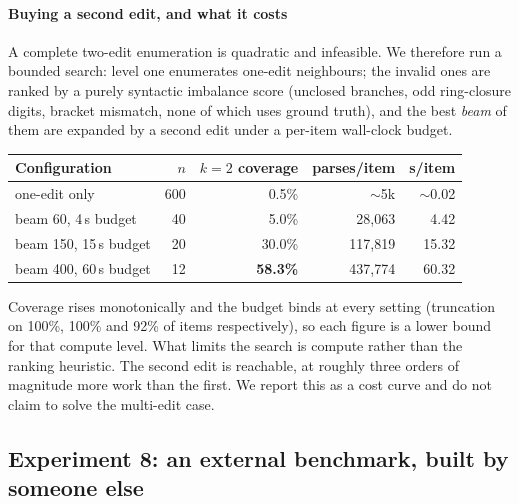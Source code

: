 \documentclass[conference]{IEEEtran}
\begin{document}
\paragraph{Buying a second edit, and what it costs}
A complete two-edit enumeration is quadratic and infeasible. We therefore run a
bounded search: level one enumerates one-edit neighbours; the invalid ones are
ranked by a purely syntactic imbalance score (unclosed branches, odd
ring-closure digits, bracket mismatch, none of which uses ground truth), and the best
\emph{beam} of them are expanded by a second edit under a per-item wall-clock
budget.

\begin{table}[t]
\centering\small
\begin{tabular}{lrrrr}
\toprule
Configuration & $n$ & $k{=}2$ coverage & parses/item & s/item \\
\midrule
one-edit only            & 600 & 0.5\%           & $\sim$5k    & $\sim$0.02 \\
beam 60, 4\,s budget     & 40  & 5.0\%           & 28{,}063    & 4.42 \\
beam 150, 15\,s budget   & 20  & 30.0\%          & 117{,}819   & 15.32 \\
beam 400, 60\,s budget   & 12  & \textbf{58.3\%} & 437{,}774   & 60.32 \\
\bottomrule
\end{tabular}
\end{table}

\noindent
Coverage rises monotonically and the budget binds at every setting (truncation
on 100\%, 100\% and 92\% of items respectively), so each figure is a lower bound
for that compute level. What limits the search is compute rather than the ranking
heuristic. The second edit is reachable, at roughly three orders of magnitude
more work than the first. We report this as a cost curve and do not claim to
solve the multi-edit case.

\subsection{Experiment 8: an external benchmark, built by someone else}\label{sec:exp8}
\end{document}
